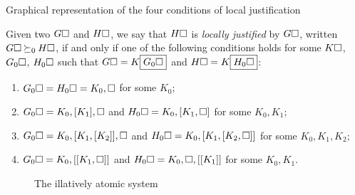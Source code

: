 \begin{scope}
\begin{scope}
\begin{marginfigure}
  
  \caption{Graphical representation of the four conditions of local
  justification}
\end{marginfigure}

\begin{definition}

  Given two  $G\square$ and $H\square$, we say that $H\square$ is
  \emph{locally justified} by $G\square$, written $G\square \mathbin{\succeq_0} H\square$, if and
  only if one of the following conditions holds for some $K\square$, $G_0\square$,
  $H_0\square$ such that $G\square = K\fbox{$G_0\square$}$ and $H\square =
  K\fbox{$H_0\square$}$:
  \begin{enumerate}
    \item $G_0\square = H_0\square = K_0, \square$ for some $K_0$;
    \item $G_0\square = K_0, [K_1], \square$ and $H_0\square = K_0, [K_1, \square]$ for
    some $K_0, K_1$;
    \item $G_0\square = K_0, [K_1, [K_2]], \square$ and $H_0\square = K_0, [K_1, [K_2,
    \square]]$ for some $K_0, K_1, K_2$;
    \item $G_0\square = K_0, [[K_1, \square]]$ and $H_0\square = K_0, \square, [[K_1]]$
    for some $K_0, K_1$.
  \end{enumerate}
\end{definition}

\begin{figure}
  
  \caption{The illatively atomic system }
\end{figure}


\end{scope}
\end{scope}
